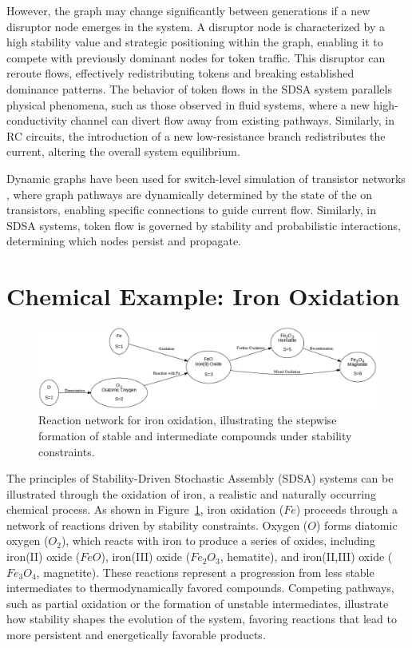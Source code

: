 \documentclass[preprint,12pt]{elsarticle}
\begin{document}
However, the graph may change significantly between generations if a new disruptor node emerges in the system. A disruptor node is characterized by a high stability value and strategic positioning within the graph, enabling it to compete with previously dominant nodes for token traffic. This disruptor can reroute flows, effectively redistributing tokens and breaking established dominance patterns. The behavior of token flows in the SDSA system parallels physical phenomena, such as those observed in fluid systems, where a new high-conductivity channel can divert flow away from existing pathways. Similarly, in RC circuits, the introduction of a new low-resistance branch redistributes the current, altering the overall system equilibrium. 

Dynamic graphs have been used for switch-level simulation of transistor networks \cite{AdlerCAD}, where graph pathways are dynamically determined by the state of the on transistors, enabling specific connections to guide current flow. Similarly, in SDSA systems, token flow is governed by stability and probabilistic interactions, determining which nodes persist and propagate.

\section{Chemical Example: Iron Oxidation}

\begin{figure}[h]
    \centering
    \includegraphics[width=1\textwidth,height=0.4\textwidth]{figure_6.png}
    \caption{Reaction network for iron oxidation, illustrating the stepwise formation of stable and intermediate compounds under stability constraints.}
    \label{fig:figure_6}
\end{figure}

The principles of Stability-Driven Stochastic Assembly (SDSA) systems can be illustrated through the oxidation of iron, a realistic and naturally occurring chemical process. As shown in Figure~\ref{fig:figure_6}, iron oxidation (\(Fe\)) proceeds through a network of reactions driven by stability constraints. Oxygen (\(O\)) forms diatomic oxygen (\(O_2\)), which reacts with iron to produce a series of oxides, including iron(II) oxide (\(FeO\)), iron(III) oxide (\(Fe_2O_3\), hematite), and iron(II,III) oxide (\(Fe_3O_4\), magnetite). These reactions represent a progression from less stable intermediates to thermodynamically favored compounds. Competing pathways, such as partial oxidation or the formation of unstable intermediates, illustrate how stability shapes the evolution of the system, favoring reactions that lead to more persistent and energetically favorable products.
\end{document}
